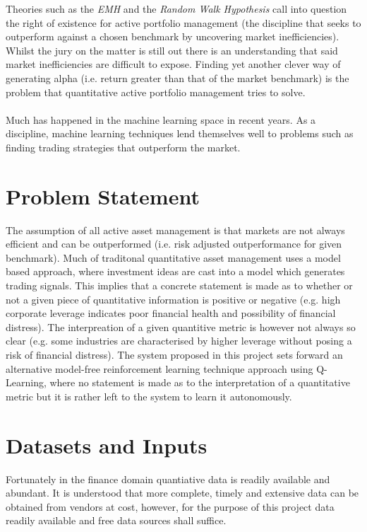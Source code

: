 \documentclass[dvips,12pt]{article}
\begin{document}
Theories such as the \emph{EMH} and the \emph{Random Walk Hypothesis}\cite{cootner1964} call into question the right of existence for active portfolio management (the discipline that seeks to outperform against a chosen benchmark by uncovering market inefficiencies). Whilst the jury on the matter is still out there is an understanding that said market inefficiencies are difficult to expose\cite{grinoldkahn1999}. Finding yet another clever way of generating alpha (i.e. return greater than that of the market benchmark) is the problem that quantitative active portfolio management tries to solve.
\\\\
Much has happened in the machine learning space in recent years. As a discipline, machine learning techniques lend themselves well to problems such as finding trading strategies that outperform the market. 

\section{Problem Statement}
The assumption of all active asset management is that markets are not always efficient and can be outperformed (i.e. risk adjusted outperformance for given benchmark). Much of traditonal quantitative asset management uses a model based approach, where investment ideas are cast into a model which generates trading signals\cite{grinoldkahn1999}. This implies that a concrete statement is made as to whether or not a given piece of quantitative information is positive or negative (e.g. high corporate leverage indicates poor financial health and possibility of financial distress). The interpreation of a given quantitive metric is however not always so clear (e.g. some industries are characterised by higher leverage without posing a risk of financial distress). The system proposed in this project sets forward an alternative model-free reinforcement learning technique approach using Q-Learning, where no statement is made as to the interpretation of a quantitative metric but it is rather left to the system to learn it autonomously.

\section{Datasets and Inputs}
Fortunately in the finance domain quantiative data is readily available and abundant. It is understood that more complete, timely and extensive data can be obtained from vendors at cost, however, for the purpose of this project data readily available and free data sources shall suffice.
\end{document}
